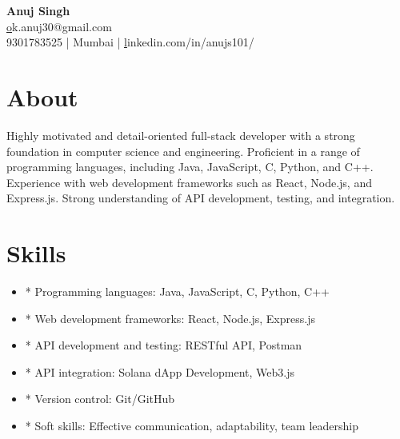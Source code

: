 \documentclass[10pt]{article}
\begin{document}
\begin{center}
    {\Huge \textbf{ Anuj Singh }}\\
    \vspace{0.2cm}
    \href{mailto:ok.anuj30@gmail.com}ok.anuj30@gmail.com \\
    9301783525 | Mumbai | \href{https://linkedin.com/in/anujs101/}linkedin.com/in/anujs101/
\end{center}

\section*{About}
Highly motivated and detail-oriented full-stack developer with a strong foundation in computer science and engineering. Proficient in a range of programming languages, including Java, JavaScript, C, Python, and C++. Experience with web development frameworks such as React, Node.js, and Express.js. Strong understanding of API development, testing, and integration.


\section*{Skills}
\begin{itemize}[leftmargin=*]

  \item * Programming languages: Java, JavaScript, C, Python, C++

  \item * Web development frameworks: React, Node.js, Express.js

  \item * API development and testing: RESTful API, Postman

  \item * API integration: Solana dApp Development, Web3.js

  \item * Version control: Git/GitHub

  \item * Soft skills: Effective communication, adaptability, team leadership

\end{itemize}
\end{document}
